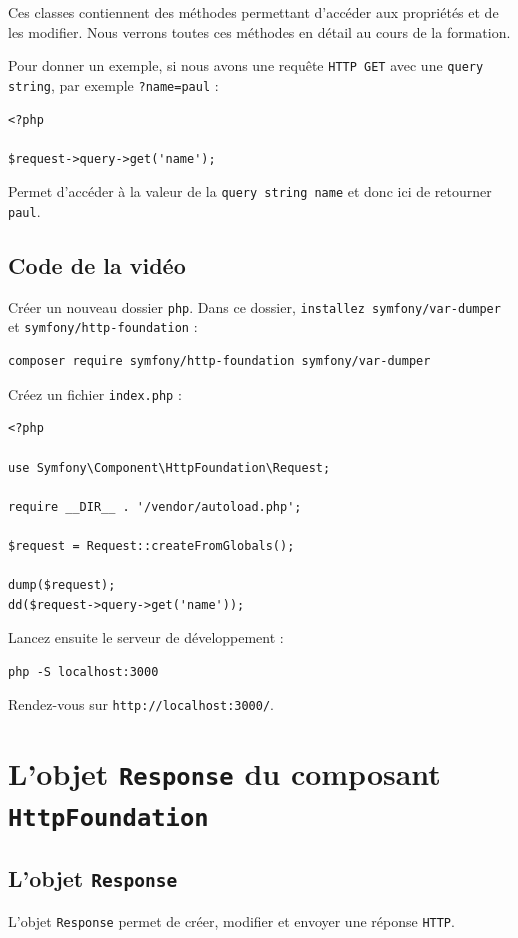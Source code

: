 \documentclass{article}
\begin{document}
Ces classes contiennent des méthodes permettant d'accéder aux propriétés et de les modifier. Nous verrons toutes ces méthodes en détail au cours de la formation.

Pour donner un exemple, si nous avons une requête {\tt HTTP GET} avec une {\tt query string}, par exemple {\tt ?name=paul} :

\begin{verbatim}
<?php

$request->query->get('name');
\end{verbatim}
Permet d'accéder à la valeur de la {\tt query string name} et donc ici de retourner {\tt paul}.

\subsection{Code de la vidéo}
Créer un nouveau dossier {\tt php}. Dans ce dossier, {\tt installez symfony/var-dumper} et {\tt symfony/http-foundation} :
\begin{verbatim}
composer require symfony/http-foundation symfony/var-dumper
\end{verbatim}

Créez un fichier {\tt index.php} :

\begin{verbatim}
<?php

use Symfony\Component\HttpFoundation\Request;

require __DIR__ . '/vendor/autoload.php';

$request = Request::createFromGlobals();

dump($request);
dd($request->query->get('name'));
\end{verbatim}
Lancez ensuite le serveur de développement :
\begin{verbatim}
php -S localhost:3000
\end{verbatim}

Rendez-vous sur {\tt http://localhost:3000/}.



\section{L'objet {\tt Response} du composant {\tt HttpFoundation}}
\subsection{L'objet {\tt Response}}
L'objet {\tt Response} permet de créer, modifier et envoyer une réponse {\tt HTTP}.
\end{document}
